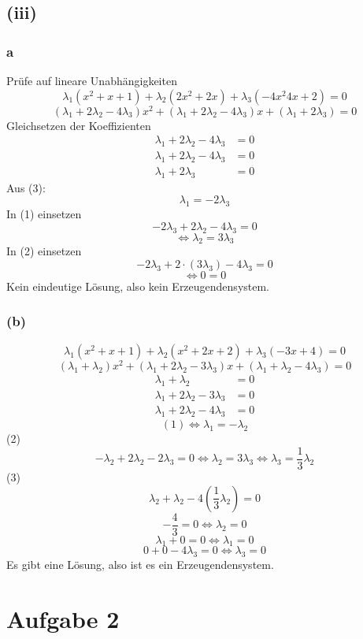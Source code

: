 \documentclass{article}
\begin{document}
\subsection*{(iii)}
\subsubsection*{a}
Prüfe auf lineare Unabhängigkeiten
\[\lambda_1(x^2 + x + 1) + \lambda_2(2x^2 + 2x) + \lambda_3(-4x^2  4x + 2) = 0\]
\[(\lambda_1 + 2 \lambda_2 - 4 \lambda_3)x^2 + (\lambda_1 + 2 \lambda_2 - 4\lambda_3)x + (\lambda_1 + 2 \lambda_3) = 0\]
Gleichsetzen der Koeffizienten
\begin{align}
    \lambda_1 + 2 \lambda_2 - 4 \lambda_3 &= 0 \\
    \lambda_1 + 2 \lambda_2 - 4 \lambda_3 &= 0 \\
    \lambda_1 + 2 \lambda_3 &= 0 
\end{align}
Aus (3):
\[\lambda_1 = -2 \lambda_3\]
In (1) einsetzen
\[-2 \lambda_3 + 2 \lambda_2 - 4 \lambda_3 = 0\]
\[\Leftrightarrow \lambda_2 = 3 \lambda_3\]
In (2) einsetzen
\[-2 \lambda_3 + 2 \cdot (3 \lambda_3) - 4 \lambda_3 = 0\]
\[\Leftrightarrow 0 = 0\]
Kein eindeutige Lösung, also kein Erzeugendensystem.

\subsubsection*{(b)}
\[\lambda_1(x^2 + x + 1) + \lambda_2 (x^2 + 2x + 2) + \lambda_3(-3x + 4) = 0\]
\[(\lambda_1 + \lambda_2)x^2 + (\lambda_1 + 2 \lambda_2 - 3 \lambda_3)x + (\lambda_1 + \lambda_2 - 4 \lambda_3) = 0\]
\begin{align}
    \lambda_1 + \lambda_2 &= 0 \\
    \lambda_1 + 2\lambda_2 - 3 \lambda_3 &= 0 \\
    \lambda_1 + 2\lambda_2 - 4 \lambda_3 &= 0 
\end{align}
\[(1) \Leftrightarrow \lambda_1 = - \lambda_2\]
(2)
\[-\lambda_2 + 2 \lambda_2 - 2 \lambda_3 = 0 \Leftrightarrow \lambda_2 = 3 \lambda_3 \Leftrightarrow \lambda_3 = \frac{1}{3} \lambda_2\]
(3)
\[\lambda_2 + \lambda_2 - 4 (\frac{1}{3} \lambda_2) = 0\]
\[-\frac{4}{3} = 0 \Leftrightarrow \lambda_2 = 0\]
\[\lambda_1 + 0 = 0 \Leftrightarrow \lambda_1 = 0\]
\[0 + 0 - 4 \lambda_3 = 0 \Leftrightarrow \lambda_3 = 0\]
Es gibt eine Lösung, also ist es ein Erzeugendensystem.

\section*{Aufgabe 2}
\end{document}
